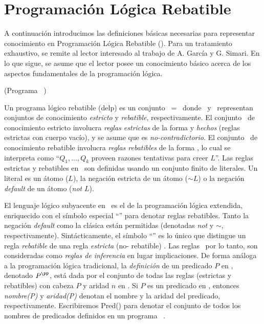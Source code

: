 \section{Programación Lógica Rebatible}
\label{sec:programacion_logica_rebatible}

A continuación introducimos las definiciones básicas necesarias para
representar conocimiento en Programación Lógica Rebatible (\DLP). Para
un tratamiento exhaustivo, se remite al lector interesado al trabajo
de A. García y G. Simari\cite{delp04}.  En lo que sigue, se asume que
el lector posee un conocimiento básico acerca de los aspectos
fundamentales de la programación lógica.

\begin{definicion}(Programa \DLP\ \PP)
\label{def:programa_delp}

Un programa lógico rebatible (delp) es un conjunto \PP\ = \SD\ donde
\SSet\ y \DD\ representan conjuntos de conocimiento \textit{estricto}
y \textit{rebatible}, respectivamente. El conjunto \SSet\ de
conocimiento estricto involucra \textit{reglas estrictas} de la forma
 y \textit{hechos} (reglas estrictas con
cuerpo vacío), y se asume que es \textit{no-contradictorio}.  El
conjunto \DD\ de conocimiento rebatible involucra \textit{reglas
rebatibles} de la forma  , lo cual se
interpreta como ``$Q_1,\ldots,Q_k$ proveen razones tentativas  para
creer $L$''. Las reglas estrictas y rebatibles en \DLP\ son definidas
usando un conjunto  finito de literales. Un literal es un átomo ($L$),
la negación estricta de un átomo ($\sim L$) o  la negación
\textit{default} de un átomo (\textit{not} $L$).

\end{definicion}

El lenguaje lógico subyacente en \DLP\ es el de la programación lógica
extendida, enriquecido con el símbolo especial ``\drule{}{}'' para
denotar reglas rebatibles. Tanto la negación  \textit{default} como la
clásica están permitidas (denotadas \textit{not} y \textit{$\sim$},
respectivamente). Sintácticamente, el símbolo ``\drule{}{}'' es lo
único que distingue un regla \textit{rebatible}
 de una regla \textit{estricta} (no-
rebatible) .  Las reglas \DLP\, por lo tanto,
son consideradas como \textit{reglas de inferencia} en lugar
implicaciones. De forma análoga a la programación lógica tradicional,
la \textit{definición} de un predicado $P$ en \PP , denotado
$P^{\scriptsize{\PP}}$, está dada por el conjunto de todas las reglas
(estrictas y rebatibles) con cabeza $P$  y aridad $n$ en \PP . Si $P$
es un predicado en \PP , entonces \textit{nombre(P)} y
\textit{aridad(P)} denotan el nombre y la aridad del predicado,
respectivamente. Escribiremos \textsf{Pred}(\PP) para denotar el
conjunto de todos los nombres de predicados definidos en un programa
\DLP\ \PP.

